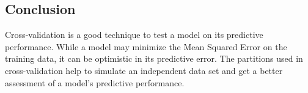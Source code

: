 \subsection*{Conclusion}
Cross-validation is a good technique to test a model on its predictive performance. While a model may minimize the Mean Squared Error on the training data, it can be optimistic in its predictive error. The partitions used in cross-validation help to simulate an independent data set and get a better assessment of a model’s predictive performance.
